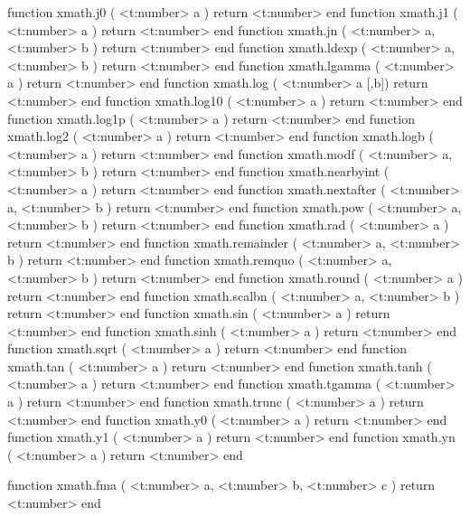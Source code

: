 function xmath.j0         ( <t:number> a )               return <t:number> end
function xmath.j1         ( <t:number> a )               return <t:number> end
function xmath.jn         ( <t:number> a, <t:number> b ) return <t:number> end
function xmath.ldexp      ( <t:number> a, <t:number> b ) return <t:number> end
function xmath.lgamma     ( <t:number> a )               return <t:number> end
function xmath.log        ( <t:number> a [,b])           return <t:number> end
function xmath.log10      ( <t:number> a )               return <t:number> end
function xmath.log1p      ( <t:number> a )               return <t:number> end
function xmath.log2       ( <t:number> a )               return <t:number> end
function xmath.logb       ( <t:number> a )               return <t:number> end
function xmath.modf       ( <t:number> a, <t:number> b ) return <t:number> end
function xmath.nearbyint  ( <t:number> a )               return <t:number> end
function xmath.nextafter  ( <t:number> a, <t:number> b ) return <t:number> end
function xmath.pow        ( <t:number> a, <t:number> b ) return <t:number> end
function xmath.rad        ( <t:number> a )               return <t:number> end
function xmath.remainder  ( <t:number> a, <t:number> b ) return <t:number> end
function xmath.remquo     ( <t:number> a, <t:number> b ) return <t:number> end
function xmath.round      ( <t:number> a )               return <t:number> end
function xmath.scalbn     ( <t:number> a, <t:number> b ) return <t:number> end
function xmath.sin        ( <t:number> a )               return <t:number> end
function xmath.sinh       ( <t:number> a )               return <t:number> end
function xmath.sqrt       ( <t:number> a )               return <t:number> end
function xmath.tan        ( <t:number> a )               return <t:number> end
function xmath.tanh       ( <t:number> a )               return <t:number> end
function xmath.tgamma     ( <t:number> a )               return <t:number> end
function xmath.trunc      ( <t:number> a )               return <t:number> end
function xmath.y0         ( <t:number> a )               return <t:number> end
function xmath.y1         ( <t:number> a )               return <t:number> end
function xmath.yn         ( <t:number> a )               return <t:number> end

function xmath.fma (
    <t:number> a,
    <t:number> b,
    <t:number> c
)
    return <t:number>
end
\stoptyping

\stopsubsection

\stopsection

\startsection[title={Optional}]

